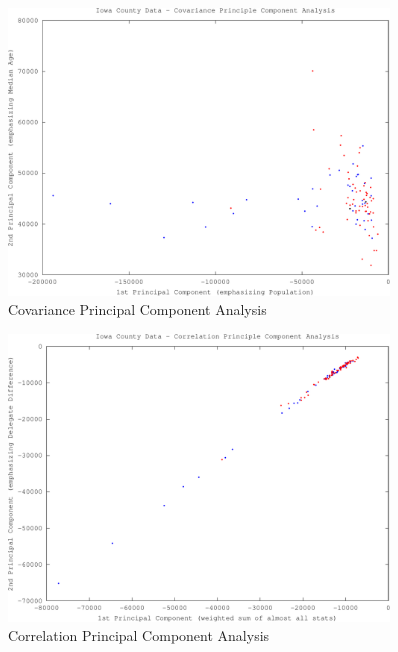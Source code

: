 \documentclass[11pt]{article}
\begin{document}
\begin{figure}[H]
    \caption{Covariance Principal Component Analysis}
    \centering
    \includegraphics[width=0.9\textwidth]{iowa-cov-pca-crop}
\end{figure}
 
\begin{multicols}{2}

\end{multicols}

\begin{figure}[H]
    \caption{Correlation Principal Component Analysis}
    \centering
    \includegraphics[width=0.9\textwidth]{iowa-corr-pca-crop}
\end{figure}
 
\end{document}

